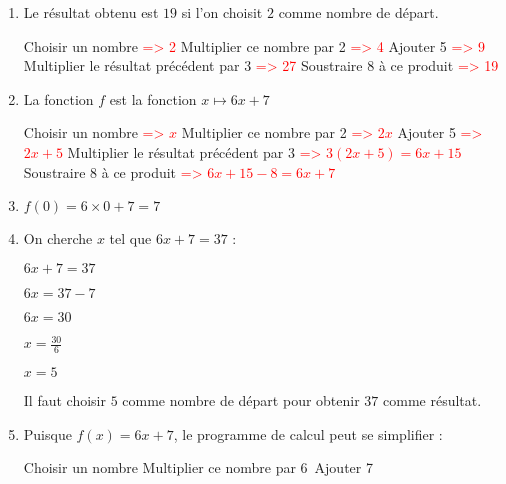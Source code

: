\begin{corrige}
     \begin{enumerate}
          \item
          Le résultat obtenu est $19$ si l'on choisit $2$ comme nombre de départ.
          \begin{code}Choisir un nombre  \textcolor{red}{=> 2}
               Multiplier ce nombre par 2  \textcolor{red}{=> 4}
               Ajouter 5  \textcolor{red}{=> 9}
               Multiplier le résultat précédent par 3  \textcolor{red}{=> 27}
               Soustraire 8 à ce produit  \textcolor{red}{=> 19}
          \end{code}
          \item
          La fonction $f$ est la fonction $x \mapsto  6x+7$
          \begin{code}Choisir un nombre  \textcolor{red}{=> $x$}
               Multiplier ce nombre par 2  \textcolor{red}{=> $2x$}
               Ajouter 5  \textcolor{red}{=> $2x+5$}
               Multiplier le résultat précédent par 3  \textcolor{red}{=> $3\left(2x+5\right)=6x+15$}
               Soustraire 8 à ce produit  \textcolor{red}{=> $6x+15-8=6x+7$}
          \end{code}
          \item
          $f\left(0\right)=6\times 0+7=7$
          \item
          On cherche $x$ tel que $6x+7=37$ :
          \par
          $6x+7=37$
          \par
          $6x=37-7$
          \par
          $6x=30$
          \par
          $x=\frac{30}{6}$
          \par
          $x=5$
          \par
          Il faut choisir $5$ comme nombre de départ pour obtenir $37$ comme résultat.
          \item
          Puisque $f\left(x\right)=6x+7$, le programme de calcul peut se simplifier :
          \begin{code}
Choisir un nombre
Multiplier ce nombre par 6\
Ajouter 7
          \end{code}
     \end{enumerate}
\end{corrige}
